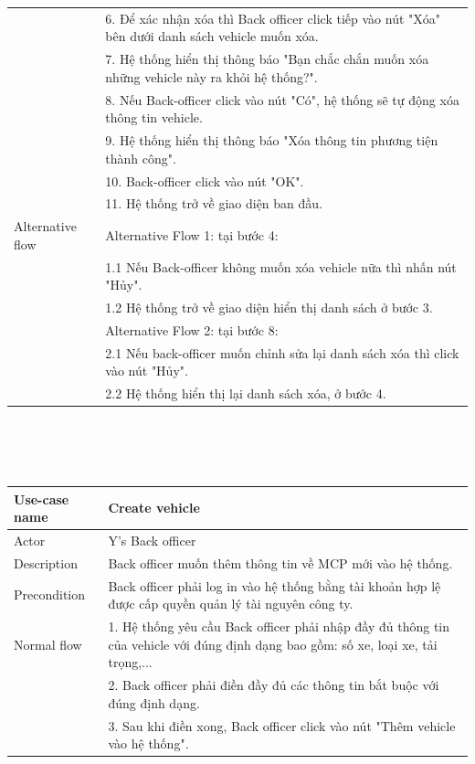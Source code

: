 \documentclass[a4paper]{article}
\begin{document}
\begin{enumerate}
\begin{enumerate}
\begin{tabular}{|p{3cm}|p{10cm}|}
         &6. Để xác nhận xóa thì Back officer click tiếp vào nút "Xóa" bên dưới danh sách vehicle muốn xóa.\\
         &7. Hệ thống hiển thị thông báo "Bạn chắc chắn muốn xóa những vehicle này ra khỏi hệ thống?". \\
         &8. Nếu Back-officer click vào nút "Có", hệ thống sẽ tự động xóa thông tin vehicle. \\
         &9. Hệ thống hiển thị thông báo "Xóa thông tin phương tiện thành công". \\
         &10. Back-officer click vào nút "OK". \\
         &11. Hệ thống trở về giao diện ban đầu. \\
         \hline
         Alternative flow & 
         Alternative Flow 1: tại bước 4: \\
        &1.1 Nếu Back-officer không muốn xóa vehicle nữa thì nhấn nút
        "Hủy". \\
        &1.2 Hệ thống trở về giao diện hiển thị danh sách ở bước 3.\\
        &Alternative Flow 2: tại bước 8:\\
        &2.1 Nếu back-officer muốn chỉnh sửa lại danh sách xóa thì click vào nút "Hủy". \\
        &2.2 Hệ thống hiển thị lại danh sách xóa, ở bước 4.\\
        \hline
    \end{tabular}
    \\ \\ \\
    \begin{tabular}{|p{3cm} | p{10cm} |}
    \hline
         Use-case name & \textbf{Create vehicle}  \\
         \hline
         Actor & Y's Back officer \\
         \hline
         Description & Back officer muốn thêm thông tin về MCP mới vào hệ thống. \\
         \hline
         Precondition & Back officer phải log in vào hệ thống bằng tài khoản hợp lệ được cấp quyền quản lý tài nguyên công ty. \\
         \hline 
         Normal flow 
         &1. Hệ thống yêu cầu Back officer phải nhập đầy đủ thông tin của vehicle với đúng định dạng bao gồm: số xe, loại xe, tải trọng,...\\
         &2. Back officer phải điền đầy đủ các thông tin bắt buộc với đúng định dạng. \\
         &3. Sau khi điền xong, Back officer click vào nút "Thêm vehicle vào hệ thống". \\

\end{tabular}
\end{enumerate}
\end{enumerate}
\end{document}
